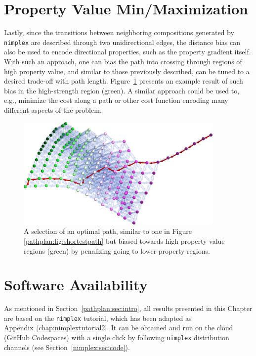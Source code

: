 \section{Property Value Min/Maximization} \label{pathplan:sec:minmax}

Lastly, since the transitions between neighboring compositions generated by \texttt{nimplex} are described through two unidirectional edges, the distance bias can also be used to encode directional properties, such as the property gradient itself. With such an approach, one can bias the path into crossing through regions of high property value, and similar to those previously described, can be tuned to a desired trade-off with path length. Figure~\ref{pathplan:fig:highrmsad} presents an example result of such bias in the high-strength region (green). A similar approach could be used to, e.g., minimize the cost along a path or other cost function encoding many different aspects of the problem.

\begin{figure}[H]
    \centering
    \includegraphics[width=0.9\textwidth]{pathplanning/InfeasibilityGliding_HighRMSAD.jpeg}
    \caption{A selection of an optimal path, similar to one in Figure \ref{pathplan:fig:shortestpath} but biased towards high property value regions (green) by penalizing going to lower property regions.}
    \label{pathplan:fig:highrmsad}
\end{figure}

\section{Software Availability} \label{pathplan:sec:softwareavaialbility}

As mentioned in Section~\ref{pathplan:sec:intro}, all results presented in this Chapter are based on the \texttt{nimplex} tutorial, which has been adapted as Appendix~\ref{chap:nimplextutorial2}. It can be obtained and run on the cloud (GitHub Codespaces) with a single click by following \texttt{nimplex} distribution channels (see Section~\ref{nimplex:sec:code}).



\printbibliography[heading=subbibintoc]